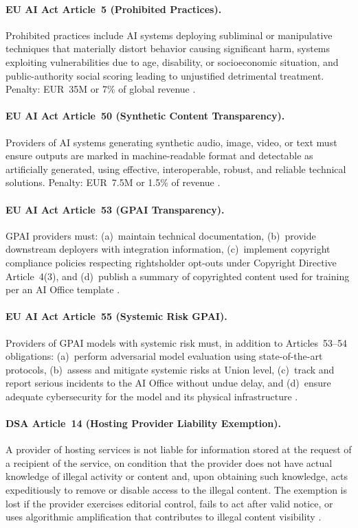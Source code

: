 \documentclass[11pt,a4paper]{article}
\begin{document}
\paragraph{EU AI Act Article~5 (Prohibited Practices).}
Prohibited practices include AI systems deploying subliminal or manipulative techniques that materially distort behavior causing significant harm, systems exploiting vulnerabilities due to age, disability, or socioeconomic situation, and public-authority social scoring leading to unjustified detrimental treatment. Penalty: EUR~35M or 7\% of global revenue \cite{aiact}.

\paragraph{EU AI Act Article~50 (Synthetic Content Transparency).}
Providers of AI systems generating synthetic audio, image, video, or text must ensure outputs are marked in machine-readable format and detectable as artificially generated, using effective, interoperable, robust, and reliable technical solutions. Penalty: EUR~7.5M or 1.5\% of revenue \cite{aiact}.

\paragraph{EU AI Act Article~53 (GPAI Transparency).}
GPAI providers must: (a)~maintain technical documentation, (b)~provide downstream deployers with integration information, (c)~implement copyright compliance policies respecting rightsholder opt-outs under Copyright Directive Article~4(3), and (d)~publish a summary of copyrighted content used for training per an AI Office template \cite{aiact}.

\paragraph{EU AI Act Article~55 (Systemic Risk GPAI).}
Providers of GPAI models with systemic risk must, in addition to Articles~53--54 obligations: (a)~perform adversarial model evaluation using state-of-the-art protocols, (b)~assess and mitigate systemic risks at Union level, (c)~track and report serious incidents to the AI Office without undue delay, and (d)~ensure adequate cybersecurity for the model and its physical infrastructure \cite{aiact}.

\paragraph{DSA Article~14 (Hosting Provider Liability Exemption).}
A provider of hosting services is not liable for information stored at the request of a recipient of the service, on condition that the provider does not have actual knowledge of illegal activity or content and, upon obtaining such knowledge, acts expeditiously to remove or disable access to the illegal content. The exemption is lost if the provider exercises editorial control, fails to act after valid notice, or uses algorithmic amplification that contributes to illegal content visibility \cite{dsa}.
\end{document}
